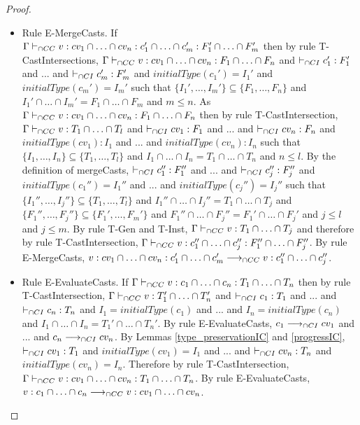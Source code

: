 \documentclass[a4paper]{article}
\begin{document}
\begin{proof}
\begin{itemize}
    \item Rule E-MergeCasts.
    If $\Gamma \vdash_{\cap CC} v : cv_1 \cap \ldots \cap cv_n : c_1' \cap \ldots \cap c_m' : F_1' \cap \ldots \cap F_m'$ then by rule T-CastIntersections, $\Gamma \vdash_{\cap CC} v : cv_1 \cap \ldots \cap cv_n : F_1 \cap \ldots \cap F_n$ and $\vdash_{\cap CI} c_1' : F_1'$ and ... and $\vdash_{\cap CI} c_m' : F_m'$ and $initialType(c_1') = I_1'$ and $initialType(c_m') = I_m'$ such that $\{I_1', \ldots, I_m'\} \subseteq \{F_1, \ldots, F_n\}$ and $I_1' \cap \ldots \cap I_m' = F_1 \cap \ldots \cap F_m$ and $m \leq n$.
    As $\Gamma \vdash_{\cap CC} v : cv_1 \cap \ldots \cap cv_n : F_1 \cap \ldots \cap F_n$ then by rule T-CastIntersection, $\Gamma \vdash_{\cap CC} v : T_1 \cap \ldots \cap T_l$ and $\vdash_{\cap CI} cv_1 : F_1$ and ... and $\vdash_{\cap CI} cv_n : F_n$ and $initialType(cv_1) : I_1$ and ... and $initialType(cv_n) : I_n$ such that $\{I_1, \ldots, I_n\} \subseteq \{T_1, \ldots, T_l\}$ and $I_1 \cap \ldots \cap I_n = T_1 \cap \ldots \cap T_n$ and $n \leq l$.
    By the definition of mergeCasts, $\vdash_{\cap CI} c_1'' : F_1''$ and ... and $\vdash_{\cap CI} c_j'' : F_j''$ and $initialType(c_1'') = I_1''$ and ... and $initialType(c_j'') = I_j''$ such that $\{I_1'', \ldots, I_j''\} \subseteq \{T_1, \ldots, T_l\}$ and $I_1'' \cap \ldots \cap I_j'' = T_1 \cap \ldots \cap T_j$ and $\{F_1'', \ldots, F_j''\} \subseteq \{F_1', \ldots, F_m'\}$ and $F_1'' \cap \ldots \cap F_j'' = F_1' \cap \ldots \cap F_j'$ and $j \leq l$ and $j \leq m$.
    By rule T-Gen and T-Inst, $\Gamma \vdash_{\cap CC} v : T_1 \cap \ldots \cap T_j$ and therefore by rule T-CastIntersection, $\Gamma \vdash_{\cap CC} v : c_1'' \cap \ldots \cap c_j'' : F_1'' \cap \ldots \cap F_j''$.
    By rule E-MergeCasts, $v : cv_1 \cap \ldots \cap cv_n : c_1' \cap \ldots \cap c_m' \longrightarrow_{\cap CC} v : c_1'' \cap \ldots \cap c_j''$.
    \item Rule E-EvaluateCasts.
    If $\Gamma \vdash_{\cap CC} v : c_1 \cap \ldots \cap c_n : T_1 \cap \ldots \cap T_n$ then by rule T-CastIntersection, $\Gamma \vdash_{\cap CC} v : T_1' \cap \ldots \cap T_n'$ and $\vdash_{\cap CI} c_1 : T_1$ and ... and $\vdash_{\cap CI} c_n : T_n$ and $I_1 = initialType(c_1)$ and ... and $I_n = initialType(c_n)$ and $I_1 \cap \ldots \cap I_n = T_1' \cap \ldots \cap T_n'$.
    By rule E-EvaluateCasts, $c_1 \longrightarrow_{\cap CI} cv_1$ and ... and $c_n \longrightarrow_{\cap CI} cv_n$.
    By Lemmas \ref{type_preservationIC} and \ref{progressIC}, $\vdash_{\cap CI} cv_1 : T_1$ and $initialType(cv_1) = I_1$ and ... and $\vdash_{\cap CI} cv_n : T_n$ and $initialType(cv_n) = I_n$.
    Therefore by rule T-CastIntersection, $\Gamma \vdash_{\cap CC} v : cv_1 \cap \ldots \cap cv_n : T_1 \cap \ldots \cap T_n$.
    By rule E-EvaluateCasts, $v : c_1 \cap \ldots \cap c_n \longrightarrow_{\cap CC} v : cv_1 \cap \ldots \cap cv_n$.

\end{itemize}
\end{proof}
\end{document}
